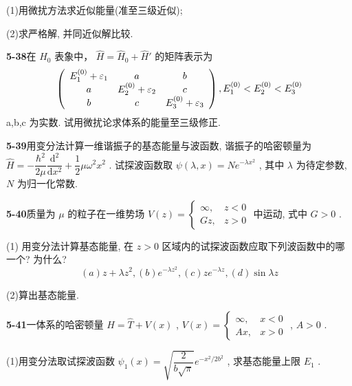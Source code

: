 (1)用微扰方法求近似能量(准至三级近似);

(2)求严格解, 并同近似解比较.

\vfill

\newpage

\textbf{5-38}\quad 在 $\displaystyle \hat{H}_0$ 表象中， $\displaystyle \hat{H} = \hat{H}_0 + \hat{H}'$ 的矩阵表示为
$$
\left( \begin{array}{c c c} E _ {1} ^ {(0)} + \varepsilon_ {1} & a & b \\ a & E _ {2} ^ {(0)} + \varepsilon_ {2} & c \\ b & c & E _ {3} ^ {(0)} + \varepsilon_ {3} \end{array} \right), E _ {1} ^ {(0)} <   E _ {2} ^ {(0)} <   E _ {3} ^ {(0)}
$$
a,b,c 为实数. 试用微扰论求体系的能量至三级修正.

\vfill

\newpage

\textbf{5-39}\quad 用变分法计算一维谐振子的基态能量与波函数, 谐振子的哈密顿量为 $\displaystyle \hat{H} = -\dfrac{\hbar^2}{2\mu}\dfrac{\mathrm{d}^2}{\mathrm{d}x^2} + \dfrac{1}{2}\mu \omega^2 x^2$ . 试探波函数取 $\displaystyle \psi(\lambda, x) = N e^{-\lambda x^2}$ , 其中 $\displaystyle \lambda$ 为待定参数, $\displaystyle N$ 为归一化常数.

\vfill

\newpage

\textbf{5-40}\quad 质量为 $\displaystyle \mu$ 的粒子在一维势场 $\displaystyle V(z) = \begin{cases} \infty, & z < 0 \\ Gz, & z > 0 \end{cases}$ 中运动, 式中 $\displaystyle G > 0$ .

(1) 用变分法计算基态能量, 在 $\displaystyle z > 0$ 区域内的试探波函数应取下列波函数中的哪一个? 为什么?
$$
(a) z + \lambda z ^ {2}, (b) e ^ {- \lambda z ^ {2}}, (c) z e ^ {- \lambda z}, (d) \sin \lambda z
$$

(2)算出基态能量.

\vfill

\newpage

\textbf{5-41}\quad 一体系的哈密顿量 $\displaystyle \hat{H} = \hat{T} + V(x)$ , $\displaystyle V(x) = \begin{cases} \infty, & x < 0 \\ Ax, & x > 0 \end{cases}$ , $\displaystyle A > 0$ .

(1)用变分法取试探波函数 $\displaystyle \psi_1(x) = \sqrt{\dfrac{2}{b\sqrt{\pi}}} e^{-x^2 / 2b^2}$ , 求基态能量上限 $\displaystyle E_1$ .

